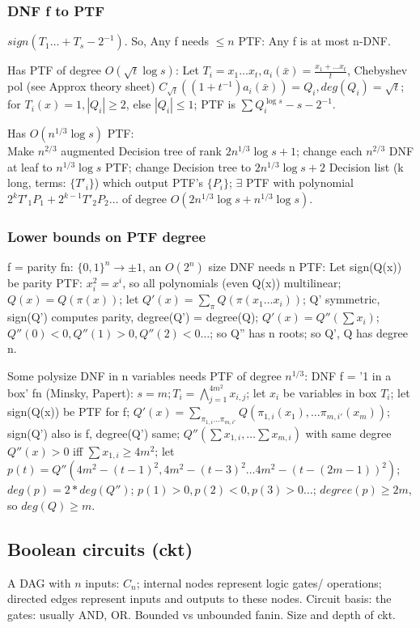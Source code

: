 \documentclass[oneside, article]{memoir}
\begin{document}
\subsubsection{DNF f to PTF}
$sign(T_{1} \dots + T_{s} - 2^{-1})$. So, Any f needs $\leq n$ PTF: Any f is at most n-DNF.

Has PTF of degree $O(\sqrt{t} \log s)$: Let $T_{i} = x_{1}\dots x_{t}, a_{i}(\bar{x}) = \frac{x_{1} + \dots x_{t}}{t}$, Chebyshev pol (see Approx theory sheet) $C_{\sqrt{t}}((1+t^{-1})a_{i}(\bar{x})) = Q_{i}, deg(Q_{i}) = \sqrt{t}$; for $T_{i}(x)=1, |Q_{i}|\geq 2$, else $|Q_{i}| \leq 1$; PTF is $\sum Q_{i}^{\log s} - s - 2^{-1}$.

Has $O(n^{1/3} \log s)$ PTF: \\
Make $n^{2/3}$ augmented Decision tree of rank $2n^{1/3}\log s + 1$; change each $n^{2/3}$ DNF at leaf to $n^{1/3} \log s$ PTF; change Decision tree to $2n^{1/3}\log s + 2$ Decision list (k long, terms: $\{T'_{i}\}$) which output PTF's $\{P_{i}\}$; $\exists$ PTF with polynomial $2^{k}T'_{1}P_{1} + 2^{k-1}T'_{2}P_{2} \dots$ of degree $O(2n^{1/3}\log s + n^{1/3} \log s)$.

\subsubsection{Lower bounds on PTF degree}
f = parity fn: $\{0,1\}^{n} \to \pm 1$, an $O(2^{n})$ size DNF needs n PTF: Let sign(Q(x)) be parity PTF: $x_{i}^{2} = x^{i}$, so all polynomials (even Q(x)) multilinear; $Q(x) = Q(\pi(x))$; let $Q'(x) = \sum_{\pi}Q(\pi(x_{1} \dots x_{i}))$; Q' symmetric, sign(Q') computes parity, degree(Q') = degree(Q); $Q'(x) = Q''(\sum x_{i})$; $Q''(0)<0, Q''(1)>0, Q''(2)<0 \dots$; so Q'' has n roots; so Q', Q has degree n.

Some polysize DNF in n variables needs PTF of degree $n^{1/3}$: DNF f = '1 in a box' fn (Minsky, Papert): $s= m; T_{i} = \bigwedge_{j=1}^{4m^{2}}x_{i,j}$; let $x_{i}$ be variables in box $T_{i}$; let sign(Q(x)) be PTF for f; $Q'(x) = \sum_{\pi_{1,i} \dots \pi_{m,i'}} Q(\pi_{1,i}(x_{1}), \dots \pi_{m,i'}(x_{m}))$; sign(Q') also is f, degree(Q') same; $Q''(\sum x_{1,i}, \dots \sum x_{m, i})$ with same degree $Q''(x)>0$ iff $\sum x_{1,i} \geq 4m^{2}$; let $p(t) = Q''(4m^{2}-(t-1)^{2}, 4m^{2}-(t-3)^{2} \dots 4m^{2}-(t-(2m-1))^{2} )$; $deg(p) = 2 * deg(Q'')$; $p(1)>0, p(2)<0, p(3)>0 \dots$; $degree(p) \geq 2m$, so $deg(Q) \geq m$.

\subsection{Boolean circuits (ckt)}
A DAG with $n$ inputs: $C_{n}$; internal nodes represent logic gates/ operations; directed edges represent inputs and outputs to these nodes. Circuit basis: the gates: usually AND, OR. Bounded vs unbounded fanin. Size and depth of ckt.
\end{document}
